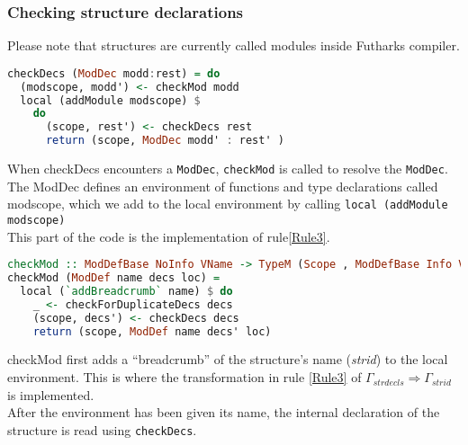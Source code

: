 \subsubsection{Checking structure declarations}\label{checkingstructuredeclarations}
Please note that structures are currently called modules inside Futharks compiler.
\begin{lstlisting}[language=Haskell]
checkDecs (ModDec modd:rest) = do
  (modscope, modd') <- checkMod modd
  local (addModule modscope) $
    do
      (scope, rest') <- checkDecs rest
      return (scope, ModDec modd' : rest' )
\end{lstlisting}
When checkDecs encounters a \texttt{ModDec}, \texttt{checkMod} is called to resolve the \texttt{ModDec}.
The ModDec defines an environment of functions and type declarations called
modscope, which we add to the local environment by calling \texttt{local
  (addModule modscope)}\\
This part of the code is the implementation of rule\ref{Rule3}.
\begin{lstlisting}[language=Haskell]
checkMod :: ModDefBase NoInfo VName -> TypeM (Scope , ModDefBase Info VName)
checkMod (ModDef name decs loc) =
  local (`addBreadcrumb` name) $ do
    _ <- checkForDuplicateDecs decs
    (scope, decs') <- checkDecs decs
    return (scope, ModDef name decs' loc)
\end{lstlisting}
checkMod first adds a ``breadcrumb'' of the structure's name (\textit{strid}) to
the local environment. This is where the transformation in rule \ref{Rule3} of
$\Gamma_{strdecls} \Rightarrow \Gamma_{strid}$ is implemented.
\\
After the environment has been given its name, the internal declaration of the
structure is read using \texttt{checkDecs}.
\\
